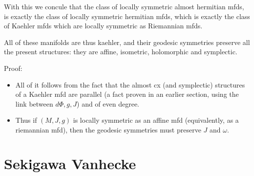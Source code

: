 \documentclass{report}
\theoremstyle{definition}
\begin{document}
\begin{itemize}
    With this we concule that the class of locally symmetric almost hermitian mfds, is exactly the class of locally symmetric hermitian mfds, which is exactly the class of Kaehler mfds which are locally symmetric as Riemannian mfds.

    All of these manifolds are thus kaehler, and their geodesic symmetries preserve all the present structures: they are affine, isometric, holomorphic and symplectic.

    Proof:
    \begin{itemize}
        \item All of it follows from the fact that the almost cx (and symplectic) structures of a Kaehler mfd are parallel (a fact proven in an earlier section, using the link between $d\Phi,g,J$) and of even degree.
        \item Thus if $(M,J,g)$ is locally symmetric as an affine mfd (equivalently, as a riemannian mfd), then the geodesic symmetries must preserve $J$ and $\omega$.
    \end{itemize}
\end{itemize}

\chapter{Sekigawa Vanhecke}
\end{document}
